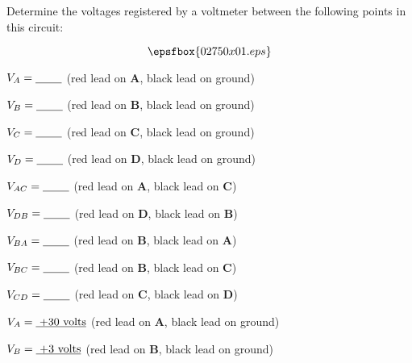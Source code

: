 

Determine the voltages registered by a voltmeter between the following points in this circuit:

$$\epsfbox{02750x01.eps}$$

$V_A = \hbox{\underbar{ \hskip 20pt}}$ (red lead on {\bf A}, black lead on ground)

\vskip 5pt

$V_B = \hbox{\underbar{ \hskip 20pt}}$ (red lead on {\bf B}, black lead on ground)

\vskip 5pt

$V_C = \hbox{\underbar{ \hskip 20pt}}$ (red lead on {\bf C}, black lead on ground)

\vskip 5pt

$V_D = \hbox{\underbar{ \hskip 20pt}}$ (red lead on {\bf D}, black lead on ground)

\vskip 20pt

$V_{AC} = \hbox{\underbar{ \hskip 20pt}}$ (red lead on {\bf A}, black lead on {\bf C})

\vskip 5pt

$V_{DB} = \hbox{\underbar{ \hskip 20pt}}$ (red lead on {\bf D}, black lead on {\bf B})

\vskip 5pt

$V_{BA} = \hbox{\underbar{ \hskip 20pt}}$ (red lead on {\bf B}, black lead on {\bf A})

\vskip 5pt

$V_{BC} = \hbox{\underbar{ \hskip 20pt}}$ (red lead on {\bf B}, black lead on {\bf C})

\vskip 5pt

$V_{CD} = \hbox{\underbar{ \hskip 20pt}}$ (red lead on {\bf C}, black lead on {\bf D})

\vskip 5pt







$V_A = \hbox{\underbar{ +30 volts}}$ (red lead on {\bf A}, black lead on ground)

\vskip 5pt

$V_B = \hbox{\underbar{ +3 volts}}$ (red lead on {\bf B}, black lead on ground)

\vskip 5pt


